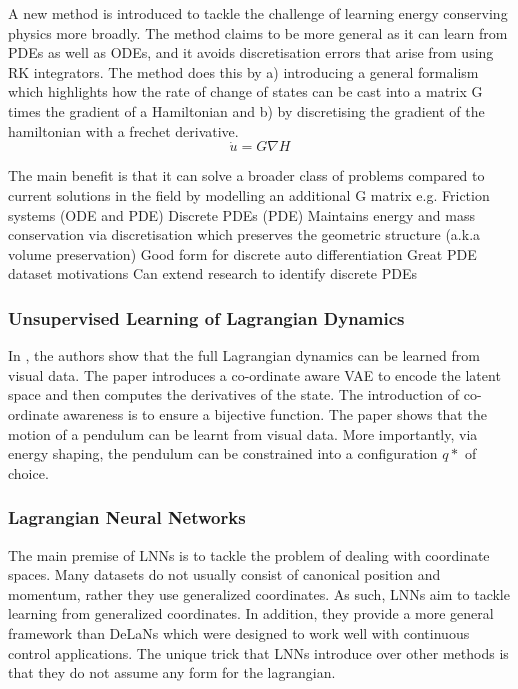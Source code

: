 \documentclass{article}
\begin{document}
A new method is introduced to tackle the challenge of learning energy conserving physics more broadly. The method claims to be more general as it can learn from PDEs as well as ODEs, and it avoids discretisation errors that arise from using RK integrators. The method does this by a) introducing a general formalism which highlights how the rate of change of states can be cast into a matrix G times the gradient of a Hamiltonian and b) by discretising the gradient of the hamiltonian with a frechet derivative. 
\begin{equation}
 \dot{u} = G\nabla H
\end{equation}
 
The main benefit is that it can solve a broader class of problems compared to current solutions in the field by modelling an additional G matrix e.g.
Friction systems (ODE and PDE)
Discrete PDEs (PDE)
Maintains energy and mass conservation via discretisation which preserves the geometric structure (a.k.a volume preservation)
Good form for discrete auto differentiation
Great PDE dataset motivations
Can extend research to identify discrete PDEs

\subsubsection{Unsupervised Learning of Lagrangian Dynamics}

In \cite{zhong_unsupervised_2020}, the authors show that the full Lagrangian dynamics can be learned from visual data. The paper introduces a co-ordinate aware VAE to encode the latent space and then computes the derivatives of the state. The introduction of co-ordinate awareness is to ensure a bijective function. The paper shows that the motion of a pendulum can be learnt from visual data. More importantly, via energy shaping, the pendulum can be constrained into a configuration $q*$ of choice.

\subsubsection{Lagrangian Neural Networks}

The main premise of LNNs \cite{cranmer_lagrangian_2020} is to tackle the problem of dealing with coordinate spaces. Many datasets do not usually consist of  canonical position and momentum, rather they use generalized coordinates. As such, LNNs aim to tackle learning from generalized coordinates. In addition, they provide a more general framework than DeLaNs which were designed to work well with continuous control applications. The unique trick that LNNs introduce over other methods is that they do not assume any form for the lagrangian. 
\end{document}
